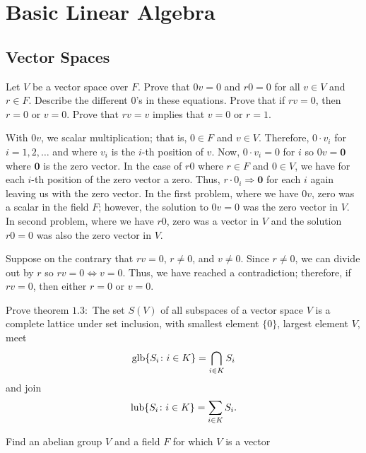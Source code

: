 \part{Basic Linear Algebra}

\chapter{Vector Spaces}

\begin{exercise}
\item
  Let \(V\) be a vector space over \(F\).
  Prove that \(0v = 0\) and \(r0 = 0\) for all \(v\in V\) and \(r\in F\).
  Describe the different \(0\)'s in these equations.
  Prove that if \(rv = 0\), then \(r = 0\) or \(v = 0\).
  Prove that \(rv = v\) implies that \(v = 0\) or \(r = 1\).
  \par\smallskip
  With \(0v\), we scalar multiplication; that is, \(0\in F\) and \(v\in V\).
  Therefore, \(0\cdot v_i\) for \(i = 1,2,\ldots\) and where \(v_i\) is the
  \(i\)-th position of \(v\).
  Now, \(0\cdot v_i = 0\) for \(i\) so \(0v=\mathbold{0}\) where
  \(\mathbold{0}\) is the zero vector.
  In the case of \(r0\) where \(r\in F\) and \(0\in V\), we have for each
  \(i\)-th position of the zero vector a zero.
  Thus, \(r\cdot 0_i\Rightarrow\mathbold{0}\) for each \(i\) again leaving us
  with the zero vector.
  In the first problem, where we have \(0v\), zero was a scalar in the field
  \(F\); however, the solution to \(0v = 0\) was the zero vector in \(V\).
  In second problem, where we have \(r0\), zero was a vector in \(V\) and the
  solution \(r0 = 0\) was also the zero vector in \(V\).
  \par\smallskip
  Suppose on the contrary that \(rv = 0\), \(r\neq 0\), and \(v\neq 0\).
  Since \(r\neq 0\), we can divide out by \(r\) so \(rv = 0\iff v = 0\).
  Thus, we have reached a contradiction; therefore, if \(rv = 0\), then either
  \(r = 0\) or \(v = 0\).
\item
  Prove theorem \(1.3:\) The set \(S(V)\) of all subspaces of a vector space
  \(V\) is a complete lattice under set inclusion, with smallest element
  \(\{0\}\), largest element \(V\), meet
  \[
  \operatorname{glb}\{S_i\colon i\in K\} = \bigcap_{i\in K}S_i
  \]
  and join
  \[
  \operatorname{lub}\{S_i\colon i\in K\} = \sum_{i\in K}S_i.
  \]
\item
  \begin{exercise}[label = (\alph*)]
  \item
    Find an abelian group \(V\) and a field \(F\) for which \(V\) is a vector

\end{exercise}
\end{exercise}
